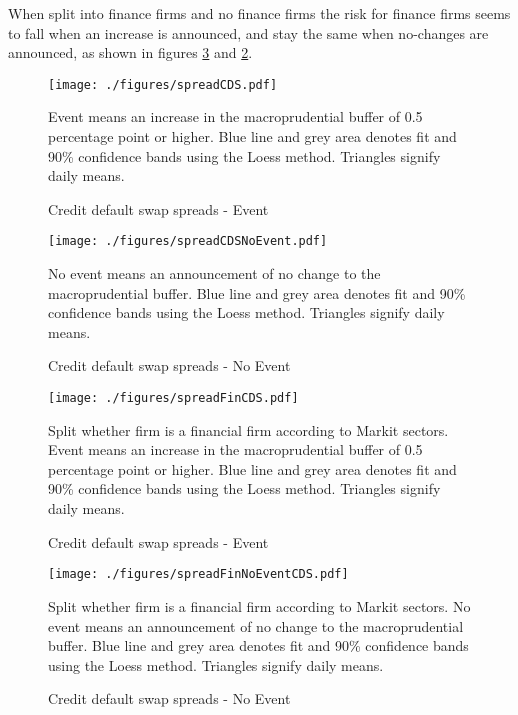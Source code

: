 \documentclass[11pt]{article}
\newcommand\fnote[1]{\captionsetup{font=small}\caption*{#1}}
\begin{document}
When split into finance firms and no finance firms the risk for finance firms seems to fall when an increase is announced, and stay the same when no-changes are announced, as shown in figures \ref{fig:eventCDSFin} and \ref{fig:eventCDSNoEvent}.

\begin{figure}%
	\centering
	\texttt{[image: ./figures/spreadCDS.pdf]}
	\caption{Credit default swap spreads - Event}
	\label{fig:eventCDS}
	\fnote{Event means an increase in the macroprudential buffer of 0.5 percentage point or higher. Blue line and grey area denotes fit and 90\% confidence bands using the Loess method. Triangles signify daily means.}
\end{figure}

\begin{figure}%
	\centering
	\texttt{[image: ./figures/spreadCDSNoEvent.pdf]}
	\caption{Credit default swap spreads - No Event}
	\label{fig:eventCDSNoEvent}
	\fnote{No event means an announcement of no change to the macroprudential buffer. Blue line and grey area denotes fit and 90\% confidence bands using the Loess method. Triangles signify daily means.}
\end{figure}


\begin{figure}%
	\centering
	\texttt{[image: ./figures/spreadFinCDS.pdf]}
	\caption{Credit default swap spreads - Event}
	\label{fig:eventCDSFin}
	\fnote{Split whether firm is a financial firm according to Markit sectors. Event means an increase in the macroprudential buffer of 0.5 percentage point or higher. Blue line and grey area denotes fit and 90\% confidence bands using the Loess method. Triangles signify daily means.}
\end{figure}

\begin{figure}%
	\centering
	\texttt{[image: ./figures/spreadFinNoEventCDS.pdf]}
	\caption{Credit default swap spreads - No Event}
	\label{fig:eventCDSFinNoEvent}
	\fnote{Split whether firm is a financial firm according to Markit sectors. No event means an announcement of no change to the macroprudential buffer. Blue line and grey area denotes fit and 90\% confidence bands using the Loess method. Triangles signify daily means.}
\end{figure}
\end{document}
